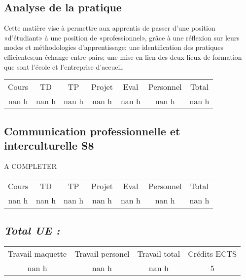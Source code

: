 \subsection{Analyse de la pratique}%
\label{subsec:Analysedelapratique}%

%
Cette matière vise à permettre aux apprentis de passer d’une position «d’étudiant» à une position de «professionnel», grâce à une réflexion sur leurs modes et méthodologies d’apprentissage; une identification des pratiques efficientes;un échange entre pairs; une mise en lien des deux lieux de formation que sont l’école et l’entreprise d’accueil.%
\begin{longtable}{c c c c c c c}%
\hline%
Cours&TD&TP&Projet&Eval&Personnel&Total\\%
nan h&nan h&nan h&nan h&nan h&nan h&nan h\\%
\hline%
\end{longtable}%
\subsection{Communication professionnelle et interculturelle S8}%
\label{subsec:CommunicationprofessionnelleetinterculturelleS8}%

%
A COMPLETER%
\begin{longtable}{c c c c c c c}%
\hline%
Cours&TD&TP&Projet&Eval&Personnel&Total\\%
nan h&nan h&nan h&nan h&nan h&nan h&nan h\\%
\hline%
\end{longtable}%
\subsection{\textit{Total UE :}}%
\label{subsec:textitTotalUE}%

%
\begin{longtable}{c c c c}%
\hline%
Travail maquette&Travail personel&Travail total&Crédits ECTS\\%
nan h&nan h&nan h&5\\%
\hline%
\end{longtable}